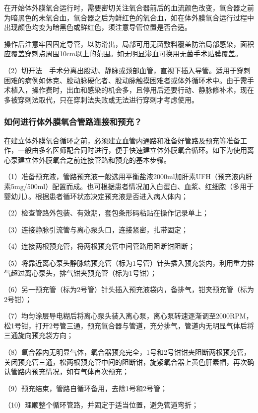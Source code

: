 在开始体外膜氧合运行时，需要密切关注氧合器前后的血流颜色改变，氧合器之前为暗黑色的未氧合血，氧合器之后为鲜红色的氧合血，如在体外膜氧合运行过程中出现颜色均变为暗黑色或鲜红色，须注意导管位置是否合适。

操作后注意牢固固定导管，以防滑出，局部可用无菌敷料覆盖防治局部感染，面积应覆盖穿刺点周围10cm以上的范围。如无明显渗血可换用无菌手术贴膜覆盖。

（2）切开法　手术分离出股动、静脉或颈部血管，直视下插入导管。适用于穿刺困难的病例如休克、股动脉硬化者、股动脉触摸困难者或体外循环术中。由于需手术植入，操作费时，出血和感染的机会多，且停用后还要行动、静脉修补术，现在多被穿刺法取代，只在穿刺法失败或无法进行穿刺才考虑使用。

\subsubsection{如何进行体外膜氧合管路连接和预充？}

在建立体外膜氧合循环之前，必须建立血管内通路和准备好管路及预充等准备工作，一般由多名医师配合同时进行，便于快速建立体外膜氧合循环。如下为使用离心泵建立体外膜氧合之前连接管路和预充的基本步骤。

（1）准备预充液，管路预充液一般选用平衡盐液2000ml加肝素UFH（预充液内肝素5mg/500ml）配置而成。也可根据患者情况加入白蛋白、血浆、红细胞（多用于婴幼儿）。根据患者循环状态决定预充液是否进入病人体内；

（2）检查管路外包装、有效期，套包条形码粘贴在操作记录单上；

（3）连接静脉引流管与离心泵头口，连接紧密，扎带固定；

（4）连接两根预充管，将两根预充管中间管路用阻断钳阻断；

（5）将靠近离心泵头静脉端预充管（标为1号管）针头插入预充袋内，利用重力排气超过离心泵头，排气钳夹预充管（标为1号钳）；

（6）另一预充管（标为2号管）针头插入预充液袋内，备排气，钳夹预充管（标为2号钳）；

（7）均匀涂层导电糊后将离心泵头装入离心泵，离心泵转速逐渐调至2000RPM，松1号钳，打开2号管三通，预充氧合器与管道，充分排气，管道内无明显气体后将三通旋向预充袋方向；

（8）氧合器内无明显气体，氧合器预充完全，1号和2号钳钳夹阻断两根预充管，关闭预充管三通，松两根预充管中间的阻断钳，旋紧氧合器上黄色肝素帽，再次确认管路内预充情况，如有气体再次预充；

（9）预充结束，管路自循环备用，去除1号和2号管；

（10）理顺整个循环管路，并固定于适当位置，避免管道弯折；

